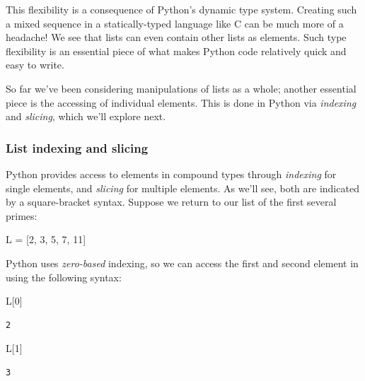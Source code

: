 \documentclass[]{article}
\newenvironment{Shaded}{}{}
\newcommand{\DecValTok}[1]{\textcolor[rgb]{0.25,0.63,0.44}{{#1}}}
\newcommand{\OperatorTok}[1]{\textcolor[rgb]{0.40,0.40,0.40}{{#1}}}
\newcommand{\NormalTok}[1]{{#1}}
\begin{document}
This flexibility is a consequence of Python's dynamic type system.
Creating such a mixed sequence in a statically-typed language like C can
be much more of a headache! We see that lists can even contain other
lists as elements. Such type flexibility is an essential piece of what
makes Python code relatively quick and easy to write.

So far we've been considering manipulations of lists as a whole; another
essential piece is the accessing of individual elements. This is done in
Python via \emph{indexing} and \emph{slicing}, which we'll explore next.

\subsubsection{List indexing and
slicing}\label{list-indexing-and-slicing}

Python provides access to elements in compound types through
\emph{indexing} for single elements, and \emph{slicing} for multiple
elements. As we'll see, both are indicated by a square-bracket syntax.
Suppose we return to our list of the first several primes:

\begin{Shaded}
\begin{Highlighting}[]
\NormalTok{L }\OperatorTok{=} \NormalTok{[}\DecValTok{2}\NormalTok{, }\DecValTok{3}\NormalTok{, }\DecValTok{5}\NormalTok{, }\DecValTok{7}\NormalTok{, }\DecValTok{11}\NormalTok{]}
\end{Highlighting}
\end{Shaded}

Python uses \emph{zero-based} indexing, so we can access the first and
second element in using the following syntax:

\begin{Shaded}
\begin{Highlighting}[]
\NormalTok{L[}\DecValTok{0}\NormalTok{]}
\end{Highlighting}
\end{Shaded}

\begin{verbatim}
2
\end{verbatim}

\begin{Shaded}
\begin{Highlighting}[]
\NormalTok{L[}\DecValTok{1}\NormalTok{]}
\end{Highlighting}
\end{Shaded}

\begin{verbatim}
3
\end{verbatim}
\end{document}
